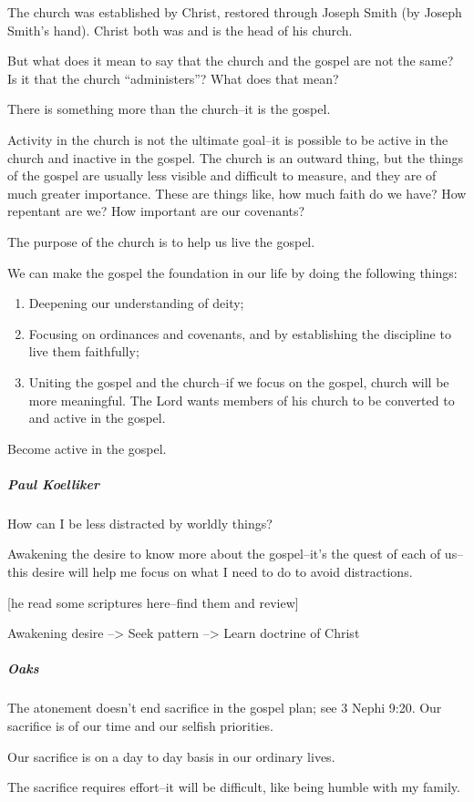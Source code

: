 The church was established by Christ, restored through Joseph Smith (by Joseph Smith's hand). Christ both was and is the head of his church.

But what does it mean to say that the church and the gospel are not the same? Is it that the church ``administers''? What does that mean?

There is something more than the church--it is the gospel.

Activity in the church is not the ultimate goal--it is possible to be active in the church and inactive in the gospel. The church is an outward thing, but the things of the gospel are usually less visible and difficult to measure, and they are of much greater importance. These are things like, how much faith do we have? How repentant are we? How important are our covenants?

The purpose of the church is to help us live the gospel.

We can make the gospel the foundation in our life by doing the following things:
\begin{enumerate}
\item Deepening our understanding of deity;
\item Focusing on ordinances and covenants, and by establishing the discipline to live them faithfully;
\item Uniting the gospel and the church--if we focus on the gospel, church will be more meaningful. The Lord wants members of his church to be converted to and active in the gospel.
\end{enumerate}

Become active in the gospel.

\subparagraph*{Paul Koelliker} How can I be less distracted by worldly things?

Awakening the desire to know more about the gospel--it's the quest of each of us--this desire will help me focus on what I need to do to avoid distractions.

[he read some scriptures here--find them and review]

Awakening desire --> Seek pattern --> Learn doctrine of Christ

\subparagraph*{Oaks} The atonement doesn't end sacrifice in the gospel plan; see 3 Nephi 9:20. Our sacrifice is of our time and our selfish priorities.

Our sacrifice is on a day to day basis in our ordinary lives.

The sacrifice requires effort--it will be difficult, like being humble with my family.

